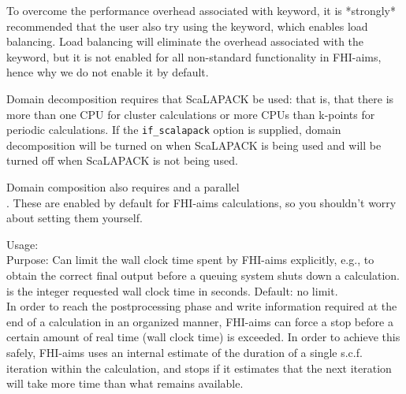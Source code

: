 To overcome the performance overhead associated with 
keyword, it is *strongly* recommended that the user also try using the
 keyword, which enables load balancing.  Load
balancing will eliminate the overhead associated with the
 keyword, but it is not enabled for all
non-standard functionality in FHI-aims, hence why we do not enable it by
default.

Domain decomposition requires that ScaLAPACK be used: that is, that there is
more than one CPU for cluster calculations or more CPUs than k-points for
periodic calculations.  If the \texttt{if\_scalapack} option is supplied, domain
decomposition will be turned on when ScaLAPACK is being used and will be turned
off when ScaLAPACK is not being used.

Domain composition also requires  and a parallel \\
.  These are enabled by default for FHI-aims
calculations, so you shouldn't worry about setting them yourself.

{
  \noindent
  Usage:   \\[1.0ex]
  Purpose: Can limit the wall clock time spent by FHI-aims explicitly,
    e.g., to obtain the correct final output before a queuing system 
    shuts down a calculation. \\[1.0ex]
   is the integer requested wall clock time in
    seconds. Default: no limit. \\
}
In order to reach the postprocessing phase and write information
required at the end of a calculation in an organized manner,
FHI-aims can force a stop before a certain amount of real time (wall
clock time) is exceeded. In order to achieve this safely, FHI-aims
uses an internal estimate of the duration of a single s.c.f. iteration
within the calculation, and stops if it estimates that the next
iteration will take more time than what remains available.

